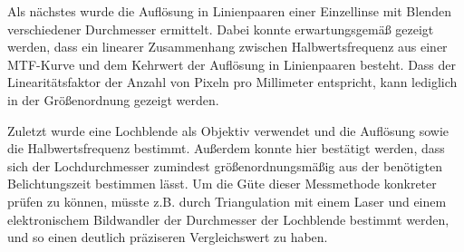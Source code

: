 \documentclass[
	a4paper,
	12pt,
	pagesize,
	ngerman
]{scrartcl}
\begin{document}
	Als nächstes wurde die Auflösung in Linienpaaren einer Einzellinse mit Blenden verschiedener Durchmesser ermittelt.
	Dabei konnte erwartungsgemäß gezeigt werden, dass ein linearer Zusammenhang zwischen Halbwertsfrequenz aus einer MTF-Kurve und dem Kehrwert der Auflösung in Linienpaaren besteht.
	Dass der Linearitätsfaktor der Anzahl von Pixeln pro Millimeter entspricht, kann lediglich in der Größenordnung gezeigt werden.
	
	Zuletzt wurde eine Lochblende als Objektiv verwendet und die Auflösung sowie die Halbwertsfrequenz bestimmt.
	Außerdem konnte hier bestätigt werden, dass sich der Lochdurchmesser zumindest größenordnungsmäßig aus der benötigten Belichtungszeit bestimmen lässt.
	Um die Güte dieser Messmethode konkreter prüfen zu können, müsste z.B. durch Triangulation mit einem Laser und einem elektronischem Bildwandler der Durchmesser der Lochblende bestimmt werden, und so einen deutlich präziseren Vergleichswert zu haben.
	\printbibliography
\end{document}
